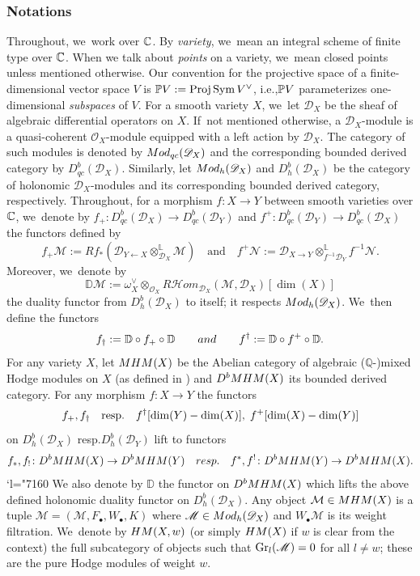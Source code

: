 \documentclass[11pt]{article}
\newcommand{\ie}{i.e.,\xspace}
\newcommand{\resp}{resp.\xspace}
\let\mathds\mathbb
\newcommand{\Changel}{\mathcode`l="7160}
\newcommand{\sbullet}{{\scriptscriptstyle\bullet}}
\newcommand{\dQ}{{\mathds Q}}\let\Q\dQ
\newcommand{\bD}{{\mathbb D}}\let\mbd\bD
\newcommand{\cD}{\mathscr{D}}
\newcommand{\cH}{\mathcal{H}}
\newcommand{\cM}{\mathcal{M}}
\newcommand{\cO}{\mathcal{O}}\let\O\cO
\DeclareMathOperator{\gr}{\textup{Gr}}
\DeclareMathOperator{\Proj}{\textup{Proj}}
\DeclareMathOperator{\Sym}{\textup{Sym}}
\newcommand{\MHM}{\textup{MHM}}
\newcommand{\HM}{\textup{HM}}
\begin{document}
\subsubsection*{Notations}
Throughout, we~work over $\C$. By \emph{variety}, we~mean an integral scheme of finite type over $\C$. When we talk about \emph{points} on a variety, we~mean closed points unless mentioned otherwise. Our convention for the projective space of a finite-dimensional vector space $V$ is $\P V := \Proj \Sym V^\vee$, \ie $\P V$ parameterizes one-dimensional \emph{subspaces} of $V$.
For a smooth variety $X$, we~let $\mathscr{D}_X$ be the sheaf of algebraic differential operators on $X$. If~not mentioned otherwise, a $\mathscr{D}_X$\nobreakdash-mod\-ule is a
quasi-coherent $\cO_X$\nobreakdash-mod\-ule equipped with a left action
by $\mathscr{D}_X$. The category of such modules is denoted by $\textup{Mod}_{qc}(\mathscr{D}_X)$ and the corresponding bounded derived category by $D_{qc}^b(\mathscr{D}_X)$.
Similarly, let $\textup{Mod}_{h}(\mathscr{D}_X)$ and $D_{h}^b(\mathscr{D}_X)$ be the category of holonomic $\mathscr D_X$\nobreakdash-mod\-ules and its corresponding bounded derived category, respectively.
Throughout, for a morphism $f \colon X \to Y$ between smooth varieties over $\C$, we~denote by $f_+ \colon D_{qc}^b(\mathscr D_X) \to D_{qc}^b(\mathscr D_Y)$ and $f^+ \colon D_{qc}^b(\mathscr D_Y) \to D_{qc}^b(\mathscr D_X)$ the functors defined by
\[
f_+ \mathscr M := Rf_*(\mathscr D_{Y \leftarrow X} \otimes^{\mathbb L}_{\mathscr D_X} \mathscr M)
\quad \text{and} \quad
f^+\mathscr N := \mathscr D_{X \to Y} \otimes^{\mathbb L}_{f^{-1} \mathscr D_Y} f^{-1} \mathscr N.
\]
Moreover, we~denote by
\[
\bD \mathscr{M} := \omega^\vee_X\otimes_{\cO_X} R{\cH\!}om_{\cD_X}(\mathscr{M},\cD_X)[\dim(X)]
\]
the duality functor from $D^b_h(\cD_X)$ to itself; it respects
$\textup{Mod}_h(\cD_X)$. We~then define the functors
\[
f_\dag:=\bD\circ f_+ \circ \bD
\quad\quad
\textup{and}
\quad\quad
f^\dag:=\bD\circ f^+ \circ \bD.
\]
For any variety $X$, let $\MHM(X)$ be the Abelian category of algebraic
($\dQ$\nobreakdash-)mixed Hodge modules on $X$ (as defined in \cite{Saito1, SaitoMHM}) and $D^b \MHM(X)$ its bounded derived category. For any morphism $f\colon X\to Y$ the functors
\[
f_+, f_\dag\quad \text{\resp}\quad f^\dag[\dim(Y)-\nobreak\dim(X)],\; f^+[\dim(X)-\dim(Y)]
\]
on $D^b_{h}(\mathscr{D}_X)$ \resp $D^b_{h}(\mathscr{D}_Y)$ lift to functors
\[
f_*, f_!\colon D^b\MHM(X)\to D^b\MHM(Y)
\quad
\textup{\resp}
\quad
f^*, f^!\colon D^b\MHM(Y)\to D^b\MHM(X).
\]
\Changel
We also denote by $\bD$ the functor on $D^b \MHM(X)$ which lifts the above defined holonomic duality functor on $D^b_h(\cD_X)$.
Any object $\cM\in \MHM(X)$ is a tuple
$\cM=(\mathscr{M},F_\sbullet, W_\sbullet, K)$ where
$\mathscr{M}\in\textup{Mod}_h(\mathscr{D}_X)$ and $W_\sbullet\mathscr{M}$ is its weight filtration. We~denote by
$\HM(X,w)$ (or simply $\HM(X)$ if $w$ is clear from the context) the full subcategory of objects such that
$\gr_l(\mathscr{M})=0$ for all $l\neq w$; these are the pure Hodge modules of weight $w$.
\end{document}
